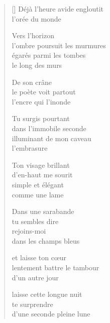 \documentclass[12pt,a4paper]{article}
\begin{document}

\newpage

\poemtitle{}

\settowidth{\versewidth}{l'ombre poursuit les murmures}

\bigskip

\begin{verse}[\versewidth]
  Déjà l'heure avide
  engloutit \\
  l'orée du monde

  Vers l'horizon \\
  l'ombre poursuit les murmures \\
  égarés parmi les tombes\\
  le long des murs

  De son crâne \\
  le poète voit partout \\
  l'encre qui l'inonde

  Tu surgis pourtant \\
  dans l'immobile seconde \\
  illuminant de mon caveau \\
  l'embrasure

  Ton visage brillant \\
  d'en-haut me sourit \\
  simple et élégant \\
  comme une lame

  Dans une sarabande \\
  tu sembles dire \\
  rejoins-moi \\
  dans les champs bleus

  et laisse ton cœur \\
  lentement battre le tambour \\
  d'un autre jour

  laisse cette longue nuit \\
  te surprendre \\
  d'une seconde pleine lune
\end{verse}


\newpage

\poemtitle{}

\settowidth{\versewidth}{le firmament en soleils innombrables}

\bigskip
\end{document}
